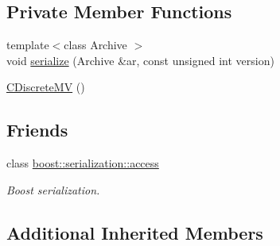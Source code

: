 \subsection*{Private Member Functions}
\begin{DoxyCompactItemize}
\item 
{\footnotesize template$<$class Archive $>$ }\\void \hyperlink{class_go_s_u_m_1_1_c_discrete_m_v_a951630f04eefaf3e1604d801a75c2cc5}{serialize} (Archive \&ar, const unsigned int version)
\item 
\hyperlink{class_go_s_u_m_1_1_c_discrete_m_v_a2e384c7bd6c78c1cb2e8d5f3edf89151}{C\-Discrete\-M\-V} ()
\end{DoxyCompactItemize}
\subsection*{Friends}
\begin{DoxyCompactItemize}
\item 
class \hyperlink{class_go_s_u_m_1_1_c_discrete_m_v_ac98d07dd8f7b70e16ccb9a01abf56b9c}{boost\-::serialization\-::access}
\begin{DoxyCompactList}\small\item\em Boost serialization. \end{DoxyCompactList}\end{DoxyCompactItemize}
\subsection*{Additional Inherited Members}


